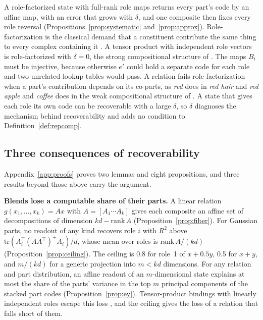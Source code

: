 \documentclass[10pt]{article}
\theoremstyle{plain}
\theoremstyle{remark}
\begin{document}
A role-factorized state with full-rank role maps returns every part's code by an affine map, with an error that grows with $\delta$, and one composite then fixes every role reversal (Propositions~\ref{prop:systematic} and~\ref{prop:approx}). Role-factorization is the classical demand that a constituent contribute the same thing to every complex containing it \citep{fodor1988}. A tensor product with independent role vectors is role-factorized with $\delta = 0$, the strong compositional structure of \citet{smolensky1987}. The maps $B_i$ must be injective, because otherwise $e'$ could hold a separate code for each role and two unrelated lookup tables would pass. A relation fails role-factorization when a part's contribution depends on its co-parts, as \emph{red} does in \emph{red hair} and \emph{red apple} \citep{kamp1995} and \emph{coffee} does in the weak compositional structure of \citet{smolensky1987}. A state that gives each role its own code can be recoverable with a large $\delta$, so $\delta$ diagnoses the mechanism behind recoverability and adds no condition to Definition~\ref{def:repcomp}.

\subsection{Three consequences of recoverability}
\label{sec:consequences}

Appendix~\ref{app:proofs} proves two lemmas and eight propositions, and three results beyond those above carry the argument.

\textbf{Blends lose a computable share of their parts.} A linear relation $g(x_1, \ldots, x_k) = A x$ with $A = [A_1 \cdots A_k]$ gives each composite an affine set of decompositions of dimension $kd - \mathrm{rank}\,A$ (Proposition~\ref{prop:fiber}). For Gaussian parts, no readout of any kind recovers role $i$ with $R^2$ above $\mathrm{tr}(A_i^{\top}(AA^{\top})^{+}A_i)/d$, whose mean over roles is $\mathrm{rank}\,A/(kd)$ (Proposition~\ref{prop:ceiling}). The ceiling is 0.8 for role~1 of $x + 0.5y$, 0.5 for $x + y$, and $m/(kd)$ for a generic projection into $m < kd$ dimensions. For any relation and part distribution, an affine readout of an $m$-dimensional state explains at most the share of the parts' variance in the top $m$ principal components of the stacked part codes (Proposition~\ref{prop:ey}). Tensor-product bindings with linearly independent roles escape this loss \citep{smolensky1990}, and the ceiling gives the loss of a relation that falls short of them.
\end{document}
